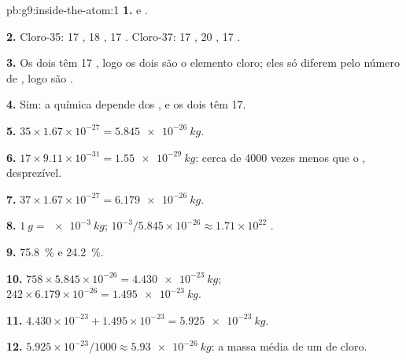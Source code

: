 \begin{solution}{pb:g9:inside-the-atom:1}
\textbf{1.}  e .

\textbf{2.} Cloro-35: 17 , 18 , 17 . Cloro-37:
17 , 20 , 17 .

\textbf{3.} Os dois têm 17 , logo os dois são o elemento cloro;
eles só diferem pelo número de , logo são .

\textbf{4.} Sim: a química depende dos , e os dois têm 17.

\textbf{5.} $35 \times 1.67 \times 10^{-27} = \qty{5.845e-26}{kg}$.

\textbf{6.} $17 \times 9.11 \times 10^{-31} = \qty{1.55e-29}{kg}$:
cerca de 4000 vezes menos que o , desprezível.

\textbf{7.} $37 \times 1.67 \times 10^{-27} = \qty{6.179e-26}{kg}$.

\textbf{8.} $\qty{1}{g} = \qty{e-3}{kg}$; $10^{-3} / 5.845 \times
10^{-26} \approx 1.71 \times 10^{22}$ .

\textbf{9.} \qty{75.8}{\percent} e \qty{24.2}{\percent}.

\textbf{10.} $758 \times 5.845 \times 10^{-26} = \qty{4.430e-23}{kg}$;
$242 \times 6.179 \times 10^{-26} = \qty{1.495e-23}{kg}$.

\textbf{11.} $4.430 \times 10^{-23} + 1.495 \times 10^{-23} =
\qty{5.925e-23}{kg}$.

\textbf{12.} $5.925 \times 10^{-23} / 1000 \approx
\qty{5.93e-26}{kg}$: a massa média de um  de cloro.
\end{solution}
